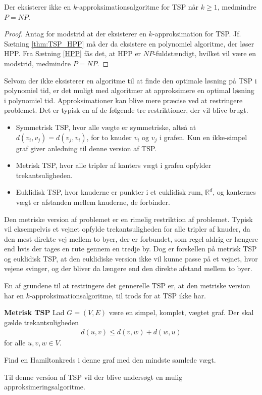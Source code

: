 \begin{tcolorbox}
	\begin{cor} \label{thm:korollar}
		Der eksisterer ikke en $k$-approksimationsalgoritme for TSP når $k \geq 1$, medmindre $P = NP$.
	\end{cor}
\end{tcolorbox}
\begin{proof}
	Antag for modstrid at der eksisterer en $k$-approksimation for TSP.
	Jf. Sætning \ref{thm:TSP_HPP} må der da eksistere en polynomiel algoritme, der løser HPP. 
	Fra Sætning \ref{HPP} fås det, at HPP er $NP$-fuldstændigt, hvilket vil være en modstrid, medmindre $P=NP$.
\end{proof}

Selvom der ikke eksisterer en algoritme til at finde den optimale løsning på TSP i polynomiel tid, er det muligt med algoritmer at approksimere en optimal løsning i polynomiel tid. Approksimationer kan blive mere præcise ved at restringere problemet.
Det er typisk en af de følgende tre restriktioner, der vil blive brugt. \citep{complex} 
\begin{itemize}[noitemsep]
	\item Symmetrisk TSP, hvor alle vægte er symmetriske, altså at $d(v_i, v_j) = d(v_j, v_i)$, for to knuder $v_i$ og $v_j$ i grafen. Kun en ikke-simpel graf giver anledning til denne version af TSP.
	\item Metrisk TSP, hvor alle tripler af kanters vægt i grafen opfylder trekantsuligheden.
	\item Euklidisk TSP, hvor knuderne er punkter i et euklidisk rum, ${\mathbb{R}}^d$, og kanternes vægt er afstanden mellem knuderne, de forbinder.
\end{itemize}

Den metriske version af problemet er en rimelig restriktion af problemet.
Typisk vil eksempelvis et vejnet opfylde trekantsuligheden for alle tripler af knuder, da den mest direkte vej mellem to byer, der er forbundet, som regel aldrig er længere end hvis der tages en rute gennem en tredje by.
Dog er forskellen på metrisk TSP og euklidisk TSP, at den euklidiske version ikke vil kunne passe på et vejnet, hvor vejene svinger, og der bliver da længere end den direkte afstand mellem to byer.

En af grundene til at restringere det gennerelle TSP er, at den metriske version har en $k$-approksimationsalgoritme, til trods for at TSP ikke har.

\begin{tcolorbox}
	\textbf{Metrisk TSP} \quad Lad $G=(V,E)$ være en simpel, komplet, vægtet graf. Der skal gælde trekantsuligheden
	\begin{align*}
		d(u,v) \leq d(v,w) + d(w,u)
	\end{align*}
	for alle $u,v,w \in V$.

	Find en Hamiltonkreds i denne graf med den mindste samlede vægt.
\end{tcolorbox}

Til denne version af TSP vil der blive undersøgt en mulig approksimeringsalgoritme.
